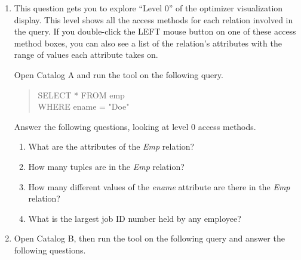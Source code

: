 \begin{enumerate}
\item
This question gets you to explore ``Level 0'' of the optimizer visualization
display.  This level shows all the access methods for each relation involved
in the query.  If you double-click the LEFT mouse button on one of these
access method boxes, you can also see a list of the relation's attributes
with the range of values each attribute takes on.

Open Catalog A and run the tool on the following query.  
\begin{quote}
        SELECT * FROM emp\\
        WHERE ename = "Doe"
\end{quote}

Answer the following questions, looking at level 0 access methods.
\begin{enumerate}
\item
What are the attributes of the {\em Emp} relation?
\item
How many tuples are in the {\em Emp} relation?
\item
How many different values of the {\em ename} attribute are there in
the {\em Emp} relation?
\item
What is the largest job ID number held by any employee?
\end{enumerate}


\item

Open Catalog B, then run the tool on the following query and answer the
following questions.
\end{enumerate}
